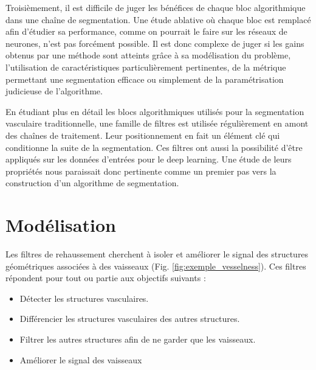     Troisièmement, il est difficile de juger les bénéfices de chaque bloc algorithmique dans une chaîne de segmentation. Une étude ablative où chaque bloc est remplacé afin d'étudier sa performance, comme on pourrait le faire sur les réseaux de neurones, n'est pas forcément possible. Il est donc complexe de juger si les gains obtenus par une méthode sont atteints grâce à sa modélisation du problème, l'utilisation de caractéristiques particulièrement pertinentes, de la métrique permettant une segmentation efficace ou simplement de la paramétrisation judicieuse de l'algorithme.

    En étudiant plus en détail les blocs algorithmiques utilisés pour la segmentation vasculaire traditionnelle, une famille de filtres est utilisée régulièrement en amont des chaînes de traitement. Leur positionnement en fait un élément clé qui conditionne la suite de la segmentation. Ces filtres ont aussi la possibilité d'être appliqués sur les données d'entrées pour le deep learning. Une étude de leurs propriétés nous paraissait donc pertinente comme un premier pas vers la construction d'un algorithme de segmentation.


  \section{Modélisation}

  Les filtres de rehaussement cherchent à isoler et améliorer le signal des structures géométriques associées à des vaisseaux (Fig. \ref{fig:exemple_vesselness}). Ces filtres répondent pour tout ou partie aux objectifs suivants :

  \begin{itemize}
  \item Détecter les structures vasculaires.
  \item Différencier les structures vasculaires des autres structures.
  \item Filtrer les autres structures afin de ne garder que les vaisseaux.
  \item Améliorer le signal des vaisseaux
  \end{itemize}


